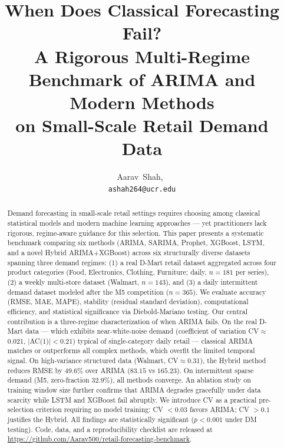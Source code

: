 \documentclass[journal]{IEEEtran}
\begin{document}
\title{When Does Classical Forecasting Fail?\\ A Rigorous Multi-Regime Benchmark of ARIMA and Modern Methods\\ on Small-Scale Retail Demand Data}

\author{Aarav~Shah,~\\
\texttt{ashah264@ucr.edu}}

\maketitle

\begin{abstract}
Demand forecasting in small-scale retail settings requires choosing among classical statistical models and modern machine learning approaches — yet practitioners lack rigorous, regime-aware guidance for this selection. This paper presents a systematic benchmark comparing six methods (ARIMA, SARIMA, Prophet, XGBoost, LSTM, and a novel Hybrid ARIMA+XGBoost) across six structurally diverse datasets spanning three demand regimes: (1) a real D-Mart retail dataset aggregated across four product categories (Food, Electronics, Clothing, Furniture; daily, $n{=}181$ per series), (2) a weekly multi-store dataset (Walmart, $n{=}143$), and (3) a daily intermittent demand dataset modeled after the M5 competition ($n{=}365$). We evaluate accuracy (RMSE, MAE, MAPE), stability (residual standard deviation), computational efficiency, and statistical significance via Diebold-Mariano testing. Our central contribution is a three-regime characterization of when ARIMA fails. On the real D-Mart data — which exhibits near-white-noise demand (coefficient of variation CV$\approx$0.021, $|$AC(1)$|<0.21$) typical of single-category daily retail — classical ARIMA matches or outperforms all complex methods, which overfit the limited temporal signal. On high-variance structured data (Walmart, CV$\approx$0.31), the Hybrid method reduces RMSE by 49.6\% over ARIMA ($83.15$ vs $165.23$). On intermittent sparse demand (M5, zero-fraction 32.9\%), all methods converge. An ablation study on training window size further confirms that ARIMA degrades gracefully under data scarcity while LSTM and XGBoost fail abruptly. We introduce CV as a practical pre-selection criterion requiring no model training: CV $<0.03$ favors ARIMA; CV $>0.1$ justifies the Hybrid. All findings are statistically significant ($p<0.001$ under DM testing). Code, data, and a reproducibility checklist are released at \url{https://github.com/Aarav500/retail-forecasting-benchmark}.
\end{abstract}
\end{document}
